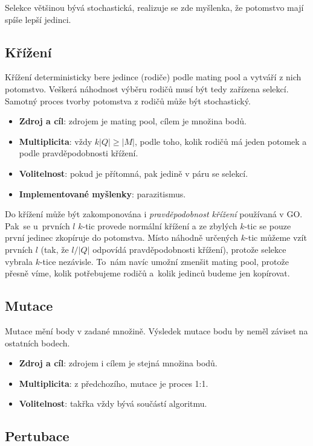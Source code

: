 Selekce většinou bývá stochastická, realizuje se zde myšlenka, že potomstvo mají spíše lepší jedinci.

\subsection{Křížení}

Křížení deterministicky bere jedince (rodiče) podle mating pool a vytváří z nich potomstvo. Veškerá náhodnost výběru rodičů musí být tedy zařízena selekcí. Samotný proces tvorby potomstva z rodičů může být stochastický.

\begin{itemize}
  \item \textbf{Zdroj a cíl}: zdrojem je mating pool, cílem je množina bodů.
  \item \textbf{Multiplicita}: vždy $k|Q| \geq |M|$, podle toho, kolik rodičů má jeden potomek a podle pravděpodobnosti křížení.
  \item \textbf{Volitelnost}: pokud je přítomná, pak jedině v páru se selekcí.
  \item \textbf{Implementované myšlenky}: parazitismus.
\end{itemize}

Do křížení může být zakomponována i \emph{pravděpodobnost křížení} používaná v GO. Pak~se u~prvních $l$ $k$-tic provede normální křížení a ze zbylých $k$-tic se pouze první jedinec zkopíruje do potomstva. Místo náhodně určených $k$-tic můžeme vzít prvních $l$ (tak, že $l/|Q|$ odpovídá pravděpodobnosti křížení), protože selekce vybrala $k$-tice nezávisle. To~nám navíc umožní zmenšit mating pool, protože přesně víme, kolik potřebujeme rodičů a~kolik jedinců budeme jen kopírovat.

\subsection{Mutace}

Mutace mění body v zadané množině. Výsledek mutace bodu by neměl záviset na ostatních bodech.
\begin{itemize}
  \item \textbf{Zdroj a cíl}: zdrojem i cílem je stejná množina bodů.
  \item \textbf{Multiplicita}: z předchozího, mutace je proces 1:1.
  \item \textbf{Volitelnost}: takřka vždy bývá součástí algoritmu.
\end{itemize}

\subsection{Pertubace}


